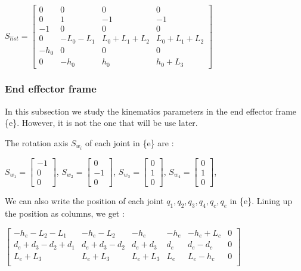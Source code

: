 \begin{center}
    $S_{list} = 
    \begin{bmatrix}
        0 & 0 & 0 & 0 \\
        0 & 1 & -1 & -1 \\
        -1 & 0 & 0 & 0 \\
        0 & -L_0-L_1 & L_0+L_1+L_2 & L_0+L_1+L_2 \\
        -h_0 & 0 & 0 & 0 \\
        0 & -h_0 & h_0 & h_0+L_3
    \end{bmatrix}
    $
\end{center}

\subsubsection{End effector frame}

\hspace{\parindent} In this subsection we study the kinematics parameters in the end effector frame \{e\}. However, it is not the one that will be use later. 

\bigbreak

The rotation axis $S_{w_i}$ of each joint  in \{e\} are : 
\begin{center}
    $S_{w_1} = \begin{bmatrix} -1 \\ 0 \\ 0\end{bmatrix}$,
    $S_{w_2} = \begin{bmatrix} 0 \\ -1 \\ 0\end{bmatrix}$,
    $S_{w_3} = \begin{bmatrix} 0 \\ 1 \\ 0\end{bmatrix}$,
    $S_{w_4} = \begin{bmatrix} 0 \\ 1 \\ 0\end{bmatrix}$,
\end{center}

\bigbreak

We can also write the position of each joint  $q_1,q_2,q_3,q_4,q_c,q_e$ in \{e\}. Lining up the position as columns, we get : 

\begin{center}
    $
    \begin{bmatrix}
        -h_e-L_2-L_1 & -h_e-L_2 & -h_e & -h_e & -h_e+L_c & 0  \\
        d_e+d_3-d_2+d_1 & d_e+d_3-d_2 & d_e+d_3 & d_e & d_e-d_c & 0 \\
        L_e+L_3 & L_e+L_3 & L_e+L_3 & L_e & L_e-h_c & 0 \\
    \end{bmatrix}
    $
\end{center}

